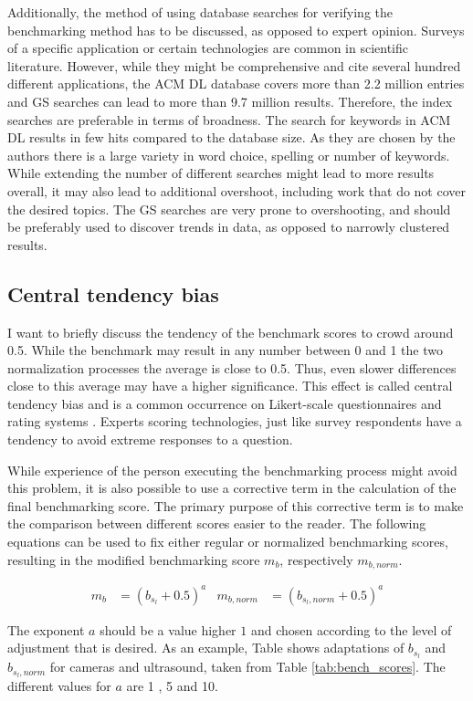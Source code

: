 Additionally, the method of using database searches for verifying the benchmarking method has to be discussed, as opposed to expert opinion. Surveys of a specific application or certain technologies are common in scientific literature. However, while they might be comprehensive and cite several hundred different applications, the ACM DL database covers more than 2.2 million entries and GS searches can lead to more than 9.7 million results. Therefore, the index searches are preferable in terms of broadness. The search for keywords in ACM DL results in few hits compared to the database size. As they are chosen by the authors there is a large variety in word choice, spelling or number of keywords. While extending the number of different searches might lead to more results overall, it may also lead to additional overshoot, including work that do not cover the desired topics. The GS searches are very prone to overshooting, and should be preferably used to discover trends in data, as opposed to narrowly clustered results.

\subsection{Central tendency bias}
I want to briefly discuss the tendency of the benchmark scores to crowd around 0.5. While the benchmark may result in any number between 0 and 1 the two normalization processes the average is close to 0.5. Thus, even slower differences close to this average may have a higher significance. This effect is called central tendency bias and is a common occurrence on Likert-scale questionnaires and rating systems \cite{crawford2000category}. Experts scoring technologies, just like survey respondents have a tendency to avoid extreme responses to a question. 

While experience of the person executing the benchmarking process might avoid this problem, it is also possible to use a corrective term in the calculation of the final benchmarking score. The primary purpose of this corrective term is to make the comparison between different scores easier to the reader. The following equations can be used to fix either regular or normalized benchmarking scores, resulting in the modified benchmarking score $m_b$, respectively $m_{b,norm}$.

\begin{align}
m_b&=(b_{s_l}+0.5)^a & m_{b,norm}&=(b_{s_l,norm}+0.5)^a
\end{align}

The exponent $a$ should be a value higher $1$ and chosen according to the level of adjustment that is desired. As an example, Table shows adaptations of $b_{s_l}$ and $b_{s_l,norm}$ for cameras and ultrasound, taken from Table \ref{tab:bench_scores}. The different values for $a$ are 1 , 5 and 10. 

